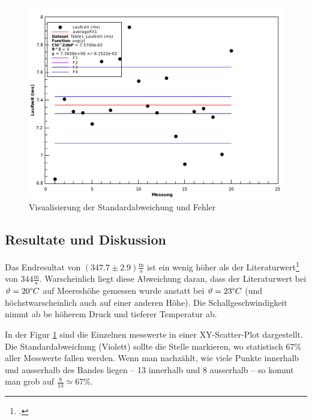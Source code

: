 \begin{figure}[H]
    \center
    \includegraphics[width=.85\textwidth]{qtiplot/schallgeschwindigkeit}
    \caption{Visualisierung der Standardabweichung und Fehler}
    \label{fig:schallgeschwindigkeit}
\end{figure}

\subsection{Resultate und Diskussion}

Das Endresultat von $(347.7\pm2.9)\frac{\textrm{m}}{\textrm{s}}$ ist ein wenig h\"oher als der
Literaturwert\footcite{ref:schallgeschwindigkeit} von $344 \frac{\textrm{m}}{\textrm{s}}$.
Warscheinlich liegt diese Abweichung daran, dass der Literaturwert bei $\vartheta=20\degree C$
auf Meeresh\"ohe gemessen wurde anstatt bei $\vartheta=23\degree C$ (und h\"ochstwarscheinlich
auch auf einer anderen H\"ohe). Die Schallgeschwindigkeit nimmt ab be h\"oherem Druck und tieferer
Temperatur ab.

In der Figur \ref{fig:schallgeschwindigkeit} sind die Einzelnen messwerte in einer XY-Scatter-Plot
dargestellt. Die Standardabweichung (Violett) sollte die Stelle markieren, wo statistisch 67\%
aller Messwerte fallen werden. Wenn man nachz\"ahlt, wie viele Punkte innerhalb und ausserhalb des
Bandes liegen -- 13 innerhalb und 8 ausserhalb -- so kommt man grob auf $\frac{8}{13}\simeq67\textrm{\%}$.

